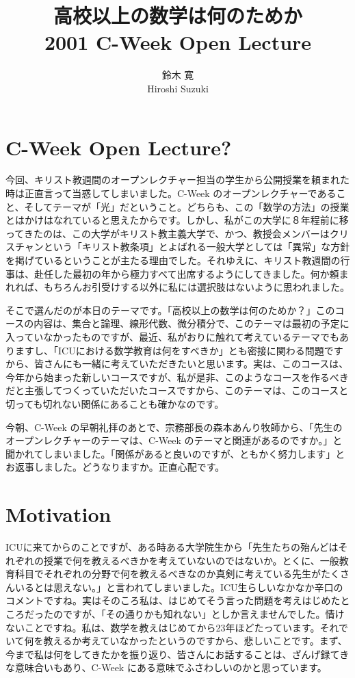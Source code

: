 \documentclass[12pt]{jarticle}
\title{高校以上の数学は何のためか\\
2001 C-Week Open Lecture}
\author{鈴木 寛\\
Hiroshi Suzuki}
\begin{document}
\maketitle

\section{C-Week Open Lecture?}
今回、キリスト教週間のオープンレクチャー担当の学生から公開授業を頼まれた時は正直言って当惑してしまいました。C-Week のオープンレクチャーであること、そしてテーマが「光」だということ。どちらも、この「数学の方法」の授業とはかけはなれていると思えたからです。しかし、私がこの大学に８年程前に移ってきたのは、この大学がキリスト教主義大学で、かつ、教授会メンバーはクリスチャンという「キリスト教条項」とよばれる一般大学としては「異常」な方針を掲げているということが主たる理由でした。それゆえに、キリスト教週間の行事は、赴任した最初の年から極力すべて出席するようにしてきました。何か頼まれれば、もちろんお引受けする以外に私には選択肢はないように思われました。

そこで選んだのが本日のテーマです。「高校以上の数学は何のためか？」このコースの内容は、集合と論理、線形代数、微分積分で、このテーマは最初の予定に入っていなかったものですが、最近、私がおりに触れて考えているテーマでもありますし、「ICUにおける数学教育は何をすべきか」とも密接に関わる問題ですから、皆さんにも一緒に考えていただきたいと思います。実は、このコースは、今年から始まった新しいコースですが、私が是非、このようなコースを作るべきだと主張してつくっていただいたコースですから、このテーマは、このコースと切っても切れない関係にあることも確かなのです。

今朝、C-Week の早朝礼拝のあとで、宗務部長の森本あんり牧師から、「先生のオープンレクチャーのテーマは、C-Week のテーマと関連があるのですか。」と聞かれてしまいました。「関係があると良いのですが、ともかく努力します」とお返事しました。どうなりますか。正直心配です。

\section{Motivation}

ICUに来てからのことですが、ある時ある大学院生から「先生たちの殆んどはそれぞれの授業で何を教えるべきかを考えていないのではないか。とくに、一般教育科目でそれぞれの分野で何を教えるべきなのか真剣に考えている先生がたくさんいるとは思えない。」と言われてしまいました。ICU生らしいなかなか辛口のコメントですね。実はそのころ私は、はじめてそう言った問題を考えはじめたところだったのですが、「その通りかも知れない」としか言えませんでした。情けないことですね。私は、数学を教えはじめてから23年ほどたっています。それでいて何を教えるか考えていなかったというのですから、悲しいことです。まず、今まで私は何をしてきたかを振り返り、皆さんにお話することは、ざんげ録てきな意味合いもあり、C-Week にある意味でふさわしいのかと思っています。
\end{document}
